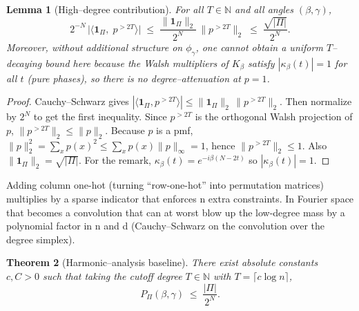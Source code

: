 \documentclass[a4paper,onecolumn,11pt,unpublished]{quantumarticle}
\newtheorem{theorem}{Theorem}
\newtheorem{lemma}[theorem]{Lemma}
\theoremstyle{remark}
\begin{document}
 \begin{lemma}[High–degree contribution]
\label{lem:tail-correct}
For all $T\in\mathbb{N}$ and all angles $(\beta,\gamma)$,
\[
  2^{-N}\,\bigl|\langle \mathbf{1}_\Pi,\; p^{>2T}\rangle\bigr|
  \;\le\; \frac{\|\mathbf{1}_\Pi\|_2}{2^N}\,\|p^{>2T}\|_2
  \;\le\; \frac{\sqrt{|\Pi|}}{2^{N}}.
\]
Moreover, without additional structure on $\phi_\gamma$, one cannot obtain a
uniform $T$–decaying bound here because the Walsh multipliers of $K_\beta$ satisfy
$|\kappa_\beta(t)|=1$ for all $t$ (pure phases), so there is no degree–attenuation at $p=1$.
\end{lemma}

\begin{proof}
Cauchy–Schwarz gives
$|\langle \mathbf{1}_\Pi, p^{>2T}\rangle|\le\|\mathbf{1}_\Pi\|_2\,\|p^{>2T}\|_2$.
Then normalize by $2^{N}$ to get the first inequality. Since $p^{>2T}$ is the orthogonal Walsh projection of $p$, $\|p^{>2T}\|_2\le \|p\|_2$.
Because $p$ is a pmf, $\|p\|_2^2=\sum_x p(x)^2\le \sum_x p(x)\|p\|_\infty=1$, hence $\|p^{>2T}\|_2\le 1$.
Also $\|\mathbf{1}_\Pi\|_2=\sqrt{|\Pi|}$.
For the remark, $\kappa_\beta(t)=e^{-i\beta(N-2t)}$ so $|\kappa_\beta(t)|=1$.
\end{proof}


Adding column one-hot (turning “row-one-hot” into permutation matrices) multiplies by a sparse indicator that enforces n extra constraints. In Fourier space that becomes a convolution that can at worst blow up the low-degree mass by a polynomial factor in n and d (Cauchy–Schwarz on the convolution over the degree simplex). 



\begin{theorem}[Harmonic–analysis baseline]
\label{thm:harmonic-baseline-correct}
There exist absolute constants $c,C>0$ such that taking the cutoff degree  $T\in\mathbb{N}$  with $T=\lceil c\log n\rceil$,
\[
  P_\Pi(\beta,\gamma)
  \;\le\;
  \frac{|\Pi|}{2^{N}}.
\]
\end{theorem}
\end{document}
